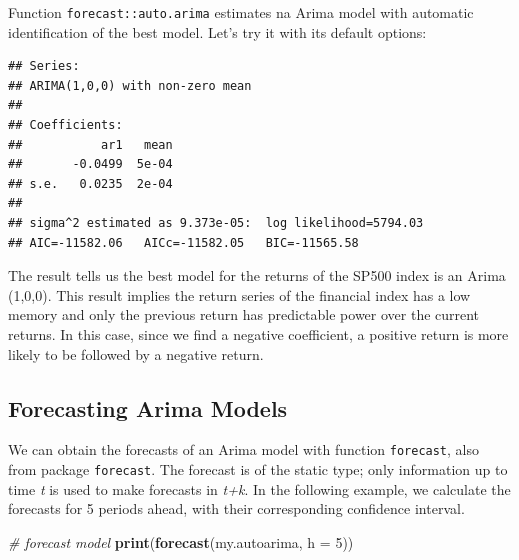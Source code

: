 \documentclass[11pt,]{book}
\newenvironment{Shaded}{\begin{snugshade}}{\end{snugshade}}
\newcommand{\KeywordTok}[1]{\textcolor[rgb]{0.27,0.27,0.27}{\textbf{#1}}}
\newcommand{\DataTypeTok}[1]{\textcolor[rgb]{0.27,0.27,0.27}{#1}}
\newcommand{\DecValTok}[1]{\textcolor[rgb]{0.06,0.06,0.06}{#1}}
\newcommand{\StringTok}[1]{\textcolor[rgb]{0.5,0.5,0.5}{#1}}
\newcommand{\CommentTok}[1]{\textcolor[rgb]{0.56,0.35,0.01}{\textit{#1}}}
\newcommand{\OperatorTok}[1]{\textcolor[rgb]{0.81,0.36,0.00}{\textbf{#1}}}
\newcommand{\NormalTok}[1]{#1}
\begin{document}
Function \texttt{forecast::auto.arima} estimates na Arima model with
automatic identification of the best model. Let's try it with its
default options:

\begin{Shaded}
\end{Shaded}

\begin{verbatim}
## Series:  
## ARIMA(1,0,0) with non-zero mean 
## 
## Coefficients:
##           ar1   mean
##       -0.0499  5e-04
## s.e.   0.0235  2e-04
## 
## sigma^2 estimated as 9.373e-05:  log likelihood=5794.03
## AIC=-11582.06   AICc=-11582.05   BIC=-11565.58
\end{verbatim}

The result tells us the best model for the returns of the SP500 index is
an Arima (1,0,0). This result implies the return series of the financial
index has a low memory and only the previous return has predictable
power over the current returns. In this case, since we find a negative
coefficient, a positive return is more likely to be followed by a
negative return.

\subsection{Forecasting Arima Models}\label{forecasting-arima-models}

We can obtain the forecasts of an Arima model with function
\texttt{forecast}, also from package \texttt{forecast}. The forecast is
of the static type; only information up to time \emph{t} is used to make
forecasts in \emph{t+k}. In the following example, we calculate the
forecasts for 5 periods ahead, with their corresponding confidence
interval. 

\begin{Shaded}
\begin{Highlighting}[]
\CommentTok{# forecast model}
\KeywordTok{print}\NormalTok{(}\KeywordTok{forecast}\NormalTok{(my.autoarima, }\DataTypeTok{h =} \DecValTok{5}\NormalTok{))}
\end{Highlighting}
\end{Shaded}
\end{document}
